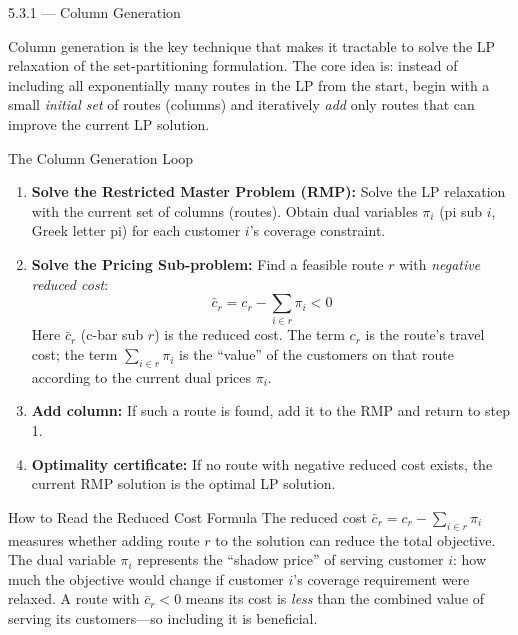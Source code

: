 \documentclass[aspectratio=169,10pt]{beamer}
\begin{document}
\begin{frame}[allowframebreaks]{5.3.1 --- Column Generation}

Column generation is the key technique that makes it tractable to solve the LP
relaxation of the set-partitioning formulation.  The core idea is: instead of
including all exponentially many routes in the LP from the start, begin with a small
\emph{initial set} of routes (columns) and iteratively \emph{add} only routes that
can improve the current LP solution.

\begin{block}{The Column Generation Loop}
\begin{enumerate}
  \item \textbf{Solve the Restricted Master Problem (RMP):} Solve the LP relaxation
    with the current set of columns (routes).  Obtain dual variables
    $\pi_i$ (pi sub $i$, Greek letter pi) for each customer $i$'s coverage
    constraint.

  \item \textbf{Solve the Pricing Sub-problem:} Find a feasible route $r$ with
    \emph{negative reduced cost}:
    \[
      \bar{c}_r = c_r - \sum_{i \in r} \pi_i < 0
    \]
    Here $\bar{c}_r$ (c-bar sub $r$) is the reduced cost.  The term $c_r$ is the
    route's travel cost; the term $\sum_{i \in r} \pi_i$ is the ``value'' of the
    customers on that route according to the current dual prices $\pi_i$.

  \item \textbf{Add column:} If such a route is found, add it to the RMP and
    return to step 1.

  \item \textbf{Optimality certificate:} If no route with negative reduced cost
    exists, the current RMP solution is the optimal LP solution.
\end{enumerate}
\end{block}

\framebreak

\begin{alertblock}{How to Read the Reduced Cost Formula}
The reduced cost $\bar{c}_r = c_r - \sum_{i \in r} \pi_i$ measures whether adding
route $r$ to the solution can reduce the total objective.  The dual variable
$\pi_i$ represents the ``shadow price'' of serving customer $i$: how much the
objective would change if customer $i$'s coverage requirement were relaxed.  A route
with $\bar{c}_r < 0$ means its cost is \emph{less} than the combined value of serving
its customers---so including it is beneficial.


\end{alertblock}
\end{frame}
\end{document}
